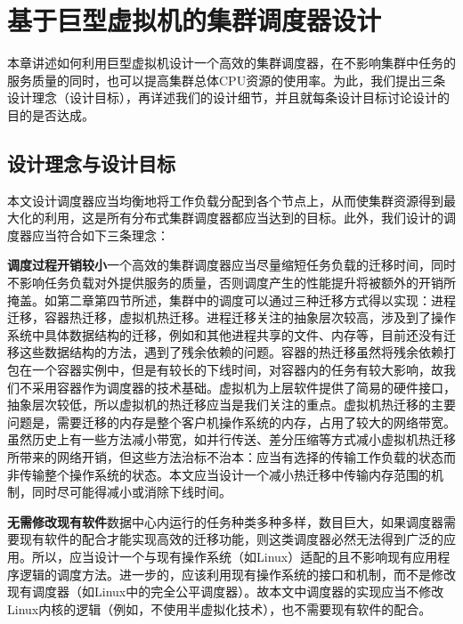 
\chapter{基于巨型虚拟机的集群调度器设计}
\label{chap:LB}
本章讲述如何利用巨型虚拟机设计一个高效的集群调度器，在不影响集群中任务的服务质量的同时，也可以提高集群总体CPU资源的使用率。为此，我们提出三条设计理念（设计目标），再详述我们的设计细节，并且就每条设计目标讨论设计的目的是否达成。
\section{设计理念与设计目标}
本文设计调度器应当均衡地将工作负载分配到各个节点上，从而使集群资源得到最大化的利用，这是所有分布式集群调度器都应当达到的目标。此外，我们设计的调度器应当符合如下三条理念：

\noindent\textbf{调度过程开销较小}\quad 一个高效的集群调度器应当尽量缩短任务负载的迁移时间，同时不影响任务负载对外提供服务的质量，否则调度产生的性能提升将被额外的开销所掩盖。如第二章第四节所述，集群中的调度可以通过三种迁移方式得以实现：进程迁移，容器热迁移，虚拟机热迁移。进程迁移关注的抽象层次较高，涉及到了操作系统中具体数据结构的迁移，例如和其他进程共享的文件、内存等，目前还没有迁移这些数据结构的方法，遇到了残余依赖的问题。容器的热迁移虽然将残余依赖打包在一个容器实例中，但是有较长的下线时间，对容器内的任务有较大影响，故我们不采用容器作为调度器的技术基础。虚拟机为上层软件提供了简易的硬件接口，抽象层次较低，所以虚拟机的热迁移应当是我们关注的重点。虚拟机热迁移的主要问题是，需要迁移的内存是整个客户机操作系统的内存，占用了较大的网络带宽。虽然历史上有一些方法减小带宽，如并行传送\cite{parallelm}、差分压缩\cite{compression}等方式减小虚拟机热迁移所带来的网络开销，但这些方法治标不治本：应当有选择的传输工作负载的状态而非传输整个操作系统的状态。本文应当设计一个减小热迁移中传输内存范围的机制，同时尽可能得减小或消除下线时间。

\noindent\textbf{无需修改现有软件}\quad 数据中心内运行的任务种类多种多样，数目巨大，如果调度器需要现有软件的配合才能实现高效的迁移功能，则这类调度器必然无法得到广泛的应用。所以，应当设计一个与现有操作系统（如Linux）适配的且不影响现有应用程序逻辑的调度方法。进一步的，应该利用现有操作系统的接口和机制，而不是修改现有调度器（如Linux中的完全公平调度器）。故本文中调度器的实现应当不修改Linux内核的逻辑（例如，不使用半虚拟化技术），也不需要现有软件的配合。

